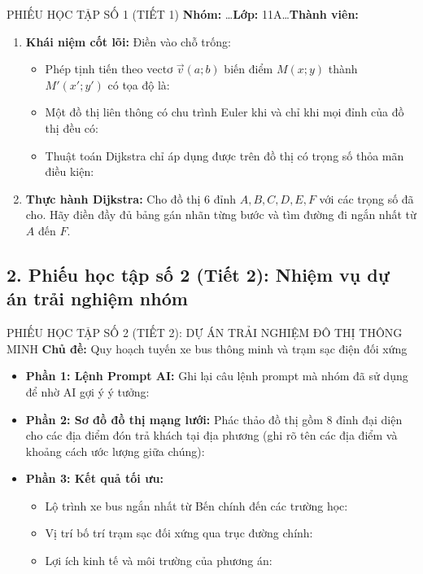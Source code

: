 \documentclass[12pt, a4paper]{article}
\renewcommand{\vec}[1]{\overrightarrow{#1}}
\begin{document}
\begin{pedabox}{PHIẾU HỌC TẬP SỐ 1 (TIẾT 1)}
\textbf{Nhóm:} \dots \quad \textbf{Lớp:} 11A\dots \quad \textbf{Thành viên:} \dotfill
\begin{enumerate}[leftmargin=0.6cm]
    \item \textbf{Khái niệm cốt lõi:} Điền vào chỗ trống:
    \begin{itemize}
        \item Phép tịnh tiến theo vectơ $\vec{v}(a;b)$ biến điểm $M(x;y)$ thành $M'(x';y')$ có tọa độ là: \dotfill
        \item Một đồ thị liên thông có chu trình Euler khi và chỉ khi mọi đỉnh của đồ thị đều có: \dotfill
        \item Thuật toán Dijkstra chỉ áp dụng được trên đồ thị có trọng số thỏa mãn điều kiện: \dotfill
    \end{itemize}
    \item \textbf{Thực hành Dijkstra:} Cho đồ thị 6 đỉnh $A, B, C, D, E, F$ với các trọng số đã cho. Hãy điền đầy đủ bảng gán nhãn từng bước và tìm đường đi ngắn nhất từ $A$ đến $F$.
\end{enumerate}
\end{pedabox}

\subsection*{2. Phiếu học tập số 2 (Tiết 2): Nhiệm vụ dự án trải nghiệm nhóm}

\begin{pedabox}{PHIẾU HỌC TẬP SỐ 2 (TIẾT 2): DỰ ÁN TRẢI NGHIỆM ĐÔ THỊ THÔNG MINH}
\textbf{Chủ đề:} Quy hoạch tuyến xe bus thông minh và trạm sạc điện đối xứng
\begin{itemize}[leftmargin=0.5cm]
    \item \textbf{Phần 1: Lệnh Prompt AI:} Ghi lại câu lệnh prompt mà nhóm đã sử dụng để nhờ AI gợi ý ý tưởng:
    \dotfill\\
    \dotfill
    \item \textbf{Phần 2: Sơ đồ đồ thị mạng lưới:} Phác thảo đồ thị gồm 8 đỉnh đại diện cho các địa điểm đón trả khách tại địa phương (ghi rõ tên các địa điểm và khoảng cách ước lượng giữa chúng):
    \dotfill\\
    \dotfill
    \item \textbf{Phần 3: Kết quả tối ưu:}
    \begin{itemize}
        \item Lộ trình xe bus ngắn nhất từ Bến chính đến các trường học: \dotfill
        \item Vị trí bố trí trạm sạc đối xứng qua trục đường chính: \dotfill
        \item Lợi ích kinh tế và môi trường của phương án: \dotfill
    \end{itemize}
\end{itemize}
\end{pedabox}
\end{document}
